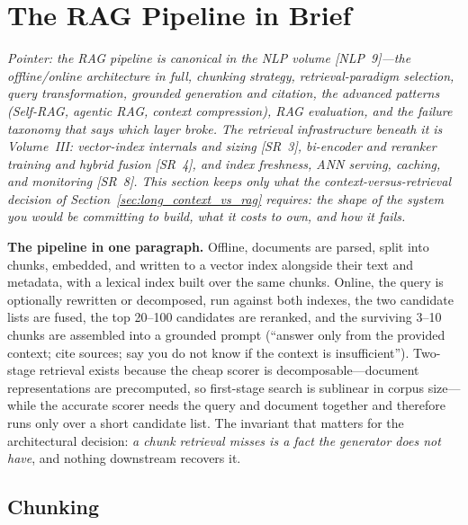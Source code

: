 \section{The RAG Pipeline in Brief}
\label{sec:rag_architecture}

\textit{Pointer: the RAG pipeline is canonical in the NLP volume [NLP~9]---the offline/online architecture in full, chunking strategy, retrieval-paradigm selection, query transformation, grounded generation and citation, the advanced patterns (Self-RAG, agentic RAG, context compression), RAG evaluation, and the failure taxonomy that says which layer broke. The retrieval infrastructure beneath it is Volume~III: vector-index internals and sizing [SR~3], bi-encoder and reranker training and hybrid fusion [SR~4], and index freshness, ANN serving, caching, and monitoring [SR~8]. This section keeps only what the context-versus-retrieval decision of Section~\ref{sec:long_context_vs_rag} requires: the shape of the system you would be committing to build, what it costs to own, and how it fails.}

\textbf{The pipeline in one paragraph.} Offline, documents are parsed, split into chunks, embedded, and written to a vector index alongside their text and metadata, with a lexical index built over the same chunks. Online, the query is optionally rewritten or decomposed, run against both indexes, the two candidate lists are fused, the top 20--100 candidates are reranked, and the surviving 3--10 chunks are assembled into a grounded prompt (``answer only from the provided context; cite sources; say you do not know if the context is insufficient''). Two-stage retrieval exists because the cheap scorer is decomposable---document representations are precomputed, so first-stage search is sublinear in corpus size---while the accurate scorer needs the query and document together and therefore runs only over a short candidate list. The invariant that matters for the architectural decision: \emph{a chunk retrieval misses is a fact the generator does not have}, and nothing downstream recovers it.
\label{fig:rag_pipeline}%

\subsection{Chunking}
\label{sec:chunking}

